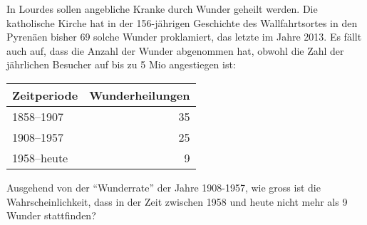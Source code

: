In Lourdes sollen angebliche Kranke durch Wunder geheilt werden.
Die katholische Kirche hat in der 156-jährigen Geschichte des Wallfahrtsortes
in den Pyrenäen bisher 69 solche Wunder proklamiert, das letzte im Jahre 2013.
Es fällt auch auf, dass die Anzahl der Wunder abgenommen hat, obwohl
die Zahl der jährlichen Besucher auf bis zu 5 Mio angestiegen ist:
\begin{center}
\begin{tabular}{|l|r|}
\hline
Zeitperiode&Wunderheilungen\\
\hline
1858--1907 &35\\
1908--1957 &25\\
1958--heute& 9\\
\hline
\end{tabular}
\end{center}
Ausgehend von der ``Wunderrate'' der Jahre 1908-1957, wie gross ist die
Wahrscheinlichkeit, dass in der Zeit zwischen 1958 und heute nicht mehr
als 9 Wunder stattfinden?

